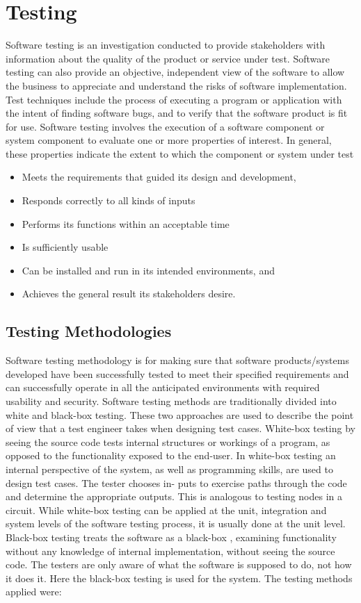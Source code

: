 \documentclass[11pt]{report}
\begin{document}
\chapter{Testing}
Software testing is an investigation conducted to provide stakeholders with information about
the quality of the product or service under test. Software testing can also provide an objective,
independent view of the software to allow the business to appreciate and understand the risks of
software implementation. Test techniques include the process of executing a program or application
with the intent of finding software bugs, and to verify that the software product is fit for use.
Software testing involves the execution of a software component or system component to evaluate
one or more properties of interest. In general, these properties indicate the extent to which the
component or system under test
\begin{itemize}
    \item Meets the requirements that guided its design and development,
    \item Responds correctly to all kinds of inputs
    \item Performs its functions within an acceptable time
\item Is sufficiently usable
\item Can be installed and run in its intended environments, and
\item Achieves the general result its stakeholders desire.
\end{itemize}
\section{Testing Methodologies}
Software testing methodology is for making sure that software products/systems developed have
been successfully tested to meet their specified requirements and can successfully operate in all the
anticipated environments with required usability and security.
Software testing methods are traditionally divided into white and black-box testing. These two
approaches are used to describe the point of view that a test engineer takes when designing test
cases.
White-box testing by seeing the source code tests internal structures or workings of a program, as
opposed to the functionality exposed to the end-user. In white-box testing an internal perspective
of the system, as well as programming skills, are used to design test cases. The tester chooses in-
puts to exercise paths through the code and determine the appropriate outputs. This is analogous
to testing nodes in a circuit. While white-box testing can be applied at the unit, integration and system levels of the software testing process, it is usually done at the unit level.
Black-box testing treats the software as a black-box , examining functionality without any knowledge of internal implementation, without seeing the source code. The testers are only aware of
what the software is supposed to do, not how it does it. Here the black-box testing is used for the
system. The testing methods applied were:
\end{document}
